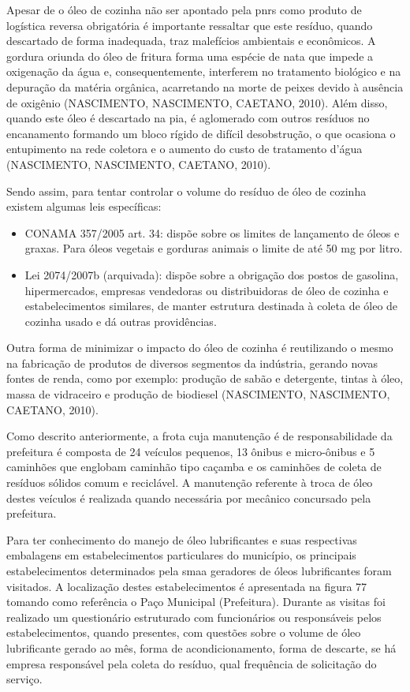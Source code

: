 \begin{description}
	Apesar de o óleo de cozinha não ser apontado pela \gls{pnrs} como produto de logística reversa obrigatória é importante ressaltar que este resíduo, quando descartado de forma inadequada, traz malefícios ambientais e econômicos. A gordura oriunda do óleo de fritura forma uma espécie de nata que impede a oxigenação da água e, consequentemente, interferem no tratamento biológico e na depuração da matéria orgânica, acarretando na morte de peixes devido à ausência de oxigênio (NASCIMENTO, NASCIMENTO, CAETANO, 2010). Além disso, quando este óleo é descartado na pia, é aglomerado com outros resíduos no encanamento formando um bloco rígido de difícil desobstrução, o que ocasiona o entupimento na rede coletora e o aumento do custo de tratamento d’água (NASCIMENTO, NASCIMENTO, CAETANO, 2010). 
	
	Sendo assim, para tentar controlar o volume do resíduo de óleo de cozinha existem algumas leis específicas: 
	
	\begin{itemize}
		\item CONAMA 357/2005 art. 34: dispõe sobre os limites de lançamento de óleos e graxas. Para óleos vegetais e gorduras animais o limite de até 50 mg por litro.
		\item Lei 2074/2007b (arquivada): dispõe sobre a obrigação dos postos de gasolina, hipermercados, empresas vendedoras ou distribuidoras de óleo de cozinha e estabelecimentos similares, de manter estrutura destinada à coleta de óleo de cozinha usado e dá outras providências. 
	\end{itemize}
	
	Outra forma de minimizar o impacto do óleo de cozinha é reutilizando o mesmo na fabricação de produtos de diversos segmentos da indústria, gerando novas fontes de renda, como por exemplo: produção de sabão e detergente, tintas à óleo, massa de vidraceiro e produção de biodiesel (NASCIMENTO, NASCIMENTO, CAETANO, 2010).
	
	Como descrito anteriormente, a frota cuja manutenção é de responsabilidade da prefeitura é composta de 24 veículos pequenos, 13 	ônibus e micro-ônibus e 5 caminhões que englobam caminhão tipo caçamba e os caminhões de coleta de resíduos sólidos comum e reciclável. A manutenção referente à troca de óleo destes veículos é realizada quando necessária por mecânico concursado pela prefeitura.
	
	Para ter conhecimento do manejo de óleo lubrificantes e suas respectivas embalagens em estabelecimentos particulares do município, os principais estabelecimentos determinados pela \gls{smaa} geradores de óleos lubrificantes foram visitados. A localização destes estabelecimentos é apresentada na figura 77 tomando como referência o Paço Municipal (Prefeitura). Durante as visitas foi realizado um questionário estruturado com funcionários ou responsáveis pelos estabelecimentos, quando presentes, com questões sobre o volume de óleo lubrificante gerado ao mês, forma de acondicionamento, forma de descarte, se há empresa responsável pela coleta do resíduo, qual frequência de solicitação do serviço.
	

\end{description}
